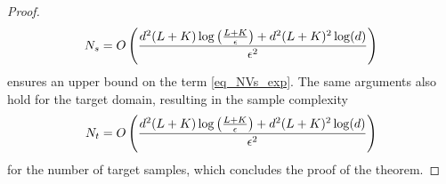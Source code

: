 \documentclass[review,supplement,onefignum,onetabnum]{siamonline250211}
\begin{document}
\begin{proof}
\begin{equation*}
\begin{split}
N_s = O \left(
\frac{  {d}^2 (L+ K) \log \left( \frac{  L + K}{\epsilon} \right) 
+
{d}^2 (L + K)^2 \log( {d}) 
}
{\epsilon^2}
\right)
\end{split}
\end{equation*}
%
ensures  an upper bound on the term \eqref{eq_NVs_exp}. The same arguments also hold for the target domain, resulting in the sample complexity
%
\begin{equation*}
\begin{split}
N_t = O \left(
\frac{  {d}^2 (L+ K) \log \left( \frac{  L + K}{\epsilon} \right) 
+
{d}^2 (L + K)^2 \log( {d}) 
}
{\epsilon^2}
\right)
\end{split}
\end{equation*}
%
for the number of target samples, which concludes the proof of the theorem.
%
\end{proof}



\clearpage
    


\end{document}

